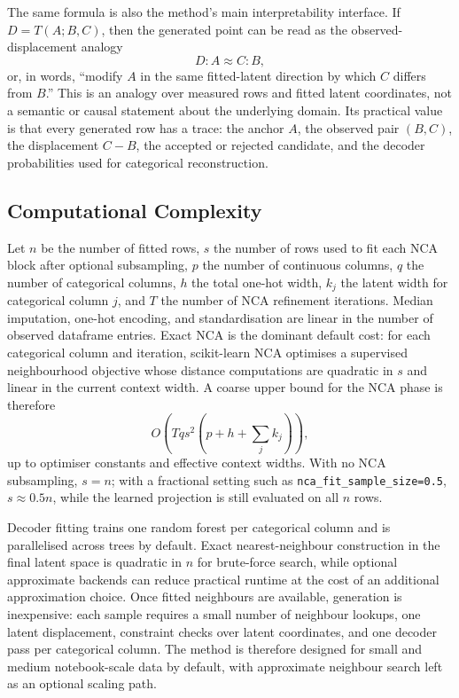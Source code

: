 The same formula is also the method's main interpretability interface. If
$D=T(A;B,C)$, then the generated point can be read as the observed-displacement
analogy
\[
  D : A \approx C : B,
\]
or, in words, ``modify $A$ in the same fitted-latent direction by which $C$
differs from $B$.'' This is an analogy over measured rows and fitted latent
coordinates, not a semantic or causal statement about the underlying domain.
Its practical value is that every generated row has a trace: the anchor $A$,
the observed pair $(B,C)$, the displacement $C-B$, the accepted or rejected
candidate, and the decoder probabilities used for categorical reconstruction.

\subsection{Computational Complexity}

Let $n$ be the number of fitted rows, $s$ the number of rows used to fit each
NCA block after optional subsampling, $p$ the number of continuous columns,
$q$ the number of categorical columns, $h$ the total one-hot width, $k_j$ the
latent width for categorical column $j$, and $T$ the number of NCA refinement
iterations. Median imputation, one-hot encoding, and standardisation are
linear in the number of observed dataframe entries. Exact NCA is the dominant
default cost: for each categorical column and iteration, scikit-learn NCA
optimises a supervised neighbourhood objective whose distance computations are
quadratic in $s$ and linear in the current context width. A coarse upper bound
for the NCA phase is therefore
\[
  O\!\left(T q s^2 (p + h + \sum_j k_j)\right),
\]
up to optimiser constants and effective context widths. With no NCA subsampling,
$s=n$; with a fractional setting such as \texttt{nca\_fit\_sample\_size=0.5},
$s\approx 0.5n$, while the learned projection is still evaluated on all $n$
rows.

Decoder fitting trains one random forest per categorical column and is
parallelised across trees by default. Exact nearest-neighbour construction in
the final latent space is quadratic in $n$ for brute-force search, while
optional approximate backends can reduce practical runtime at the cost of an
additional approximation choice. Once fitted neighbours are available,
generation is inexpensive: each sample requires a small number of neighbour
lookups, one latent displacement, constraint checks over latent coordinates,
and one decoder pass per categorical column. The method is therefore designed
for small and medium notebook-scale data by default, with approximate
neighbour search left as an optional scaling path.

